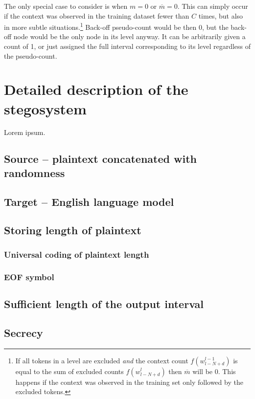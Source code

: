 \documentclass{IIBproject}
\begin{document}
The only special case to consider is when $m=0$ or $\overline m = 0$. This can simply occur if the context was observed in the training dataset fewer than $C$ times, but also in more subtle situations.\footnote{If all tokens in a level are excluded \emph{and} the context count $f(w_{l-N+d}^{l-1})$ is equal to the sum of excluded counts $f(w_{l-N+d}^l)$ then $\overline m$ will be 0. This happens if the context was observed in the training set only followed by the excluded tokens.} Back-off pseudo-count would be then 0, but the back-off node would be the only node in its level anyway. It can be arbitrarily given a count of 1, or just assigned the full interval corresponding to its level regardless of the pseudo-count.

\newpage
\section{Detailed description of the stegosystem}

Lorem ipsum.

\subsection{Source -- plaintext concatenated with randomness}

\subsection{Target -- English language model}

\subsection{Storing length of plaintext}

\subsubsection{Universal coding of plaintext length}

\subsubsection{EOF symbol}

\subsection{Sufficient length of the output interval}

\subsection{Secrecy}
\end{document}
